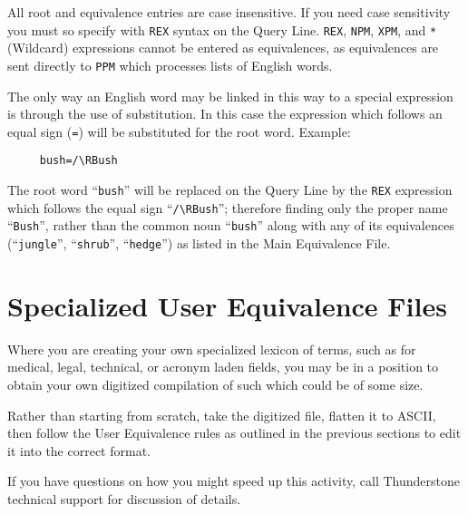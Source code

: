 All root and equivalence entries are case insensitive.  If you need
case sensitivity you must so specify with \verb`REX` syntax on the
Query Line.  \verb`REX`, \verb`NPM`, \verb`XPM`, and \verb`*`
(Wildcard) expressions cannot be entered as equivalences, as
equivalences are sent directly to \verb`PPM` which processes lists of
English words.

The only way an English word may be linked in this way to a special
expression is through the use of substitution.  In this case the
expression which follows an equal sign (\verb`=`) will be substituted
for the root word.  Example:

\begin{verbatim}
     bush=/\RBush
\end{verbatim}

The root word ``\verb`bush`'' will be replaced on the Query Line by
the \verb`REX` expression which follows the equal sign
``\verb`/\RBush`''; therefore finding only the proper name
``\verb`Bush`'', rather than the common noun ``\verb`bush`'' along
with any of its equivalences (``\verb`jungle`'', ``\verb`shrub`'',
``\verb`hedge`'') as listed in the Main Equivalence File.

\section{Specialized User Equivalence Files}

Where you are creating your own specialized lexicon of terms, such as
for medical, legal, technical, or acronym laden fields, you may be in
a position to obtain your own digitized compilation of such which
could be of some size.

Rather than starting from scratch, take the digitized file, flatten it
to ASCII, then follow the User Equivalence rules as outlined in the
previous sections to edit it into the correct format.

If you have questions on how you might speed up this activity, call
Thunderstone technical support for discussion of details.

